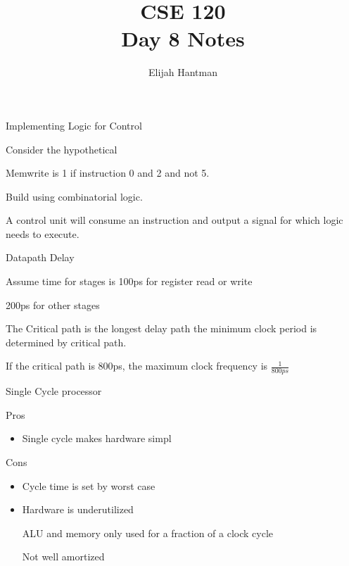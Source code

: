 \documentclass{report}
\title{\Huge{CSE 120}\\Day 8 Notes}
\author{\huge{Elijah Hantman}}
\date{}
\begin{document}
\maketitle
\newpage

\begin{description}
    \item Implementing Logic for Control 
        \begin{mdframed}
            Consider the hypothetical
            
            Memwrite is 1 if instruction 0 and 2 and not 5.
            
            Build using combinatorial logic.

            A control unit will consume an instruction and
            output a signal for which logic needs to execute.
        \end{mdframed}

    \item Datapath Delay
        \begin{mdframed}
            Assume time for stages is 100ps for register
            read or write

            200ps for other stages

            The Critical path is the longest delay path
            the minimum clock period is determined by critical
            path.

            If the critical path is 800ps, the maximum
            clock frequency is $\frac{1}{800ps}$
        \end{mdframed}

    \item Single Cycle processor
        \begin{mdframed}
            Pros
            \begin{itemize}
                \item Single cycle makes hardware simpl
            \end{itemize}

            Cons
            \begin{itemize}
                \item Cycle time is set by worst case
                \item Hardware is underutilized

                    ALU and memory only used for a fraction
                    of a clock cycle

                    Not well amortized


\end{itemize}
\end{mdframed}
\end{description}
\end{document}
